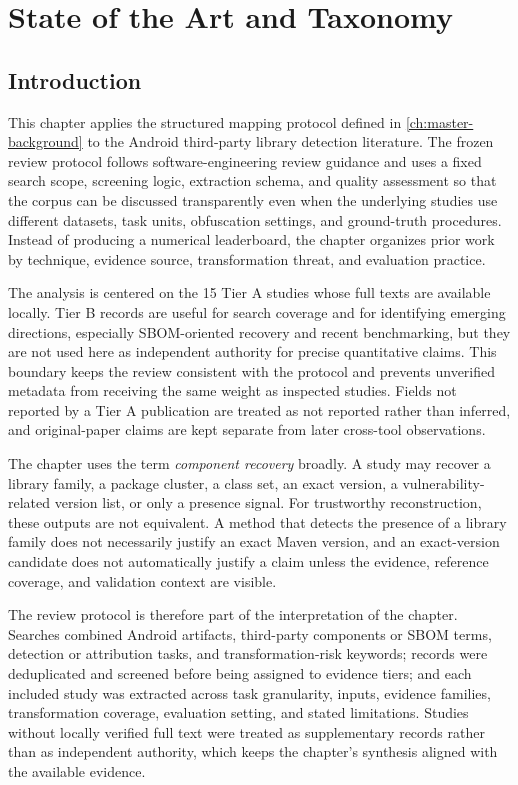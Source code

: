 \chapter{State of the Art and Taxonomy}
\label{ch:master-sota}

\section{Introduction}

This chapter applies the structured mapping protocol defined in
\cref{ch:master-background} to the Android third-party library detection
literature. The frozen review protocol follows software-engineering review
guidance \cite{kitchenham2007guidelines} and uses a fixed search scope,
screening logic, extraction schema, and quality assessment so that the corpus
can be discussed transparently even when the underlying studies use different
datasets, task units, obfuscation settings, and ground-truth procedures.
Instead of producing a numerical leaderboard, the chapter organizes prior
work by technique, evidence source, transformation threat, and evaluation
practice.

The analysis is centered on the 15 Tier A studies whose full texts are
available locally. Tier B records are useful for search coverage and for
identifying emerging directions, especially SBOM-oriented recovery and recent
benchmarking, but they are not used here as independent authority for precise
quantitative claims. This boundary keeps the review consistent with the
protocol and prevents unverified metadata from receiving the same weight as
inspected studies. Fields not reported by a Tier A publication are treated as
not reported rather than inferred, and original-paper claims are kept
separate from later cross-tool observations.

The chapter uses the term \emph{component recovery} broadly. A study may
recover a library family, a package cluster, a class set, an exact version, a
vulnerability-related version list, or only a presence signal. For trustworthy
\SBOM reconstruction, these outputs are not equivalent. A method that detects
the presence of a library family does not necessarily justify an exact Maven
version, and an exact-version candidate does not automatically justify a
\CVE claim unless the evidence, reference coverage, and validation context are
visible.

The review protocol is therefore part of the interpretation of the chapter.
Searches combined Android artifacts, third-party components or SBOM terms,
detection or attribution tasks, and transformation-risk keywords; records were
deduplicated and screened before being assigned to evidence tiers; and each
included study was extracted across task granularity, inputs, evidence
families, transformation coverage, evaluation setting, and stated
limitations. Studies without locally verified full text were treated as
supplementary records rather than as independent authority, which keeps the
chapter's synthesis aligned with the available evidence.

